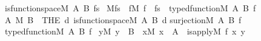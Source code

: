 \begin{isabelle}%
is{\isacharunderscore}{\kern0pt}function{\isacharunderscore}{\kern0pt}space{\isacharparenleft}{\kern0pt}M{\isacharcomma}{\kern0pt}\ A{\isacharcomma}{\kern0pt}\ B{\isacharcomma}{\kern0pt}\ fs{\isacharparenright}{\kern0pt}\ {\isasymequiv}\isanewline
M{\isacharparenleft}{\kern0pt}fs{\isacharparenright}{\kern0pt}\ {\isasymand}\ {\isacharparenleft}{\kern0pt}{\isasymforall}f{\isacharbrackleft}{\kern0pt}M{\isacharbrackright}{\kern0pt}{\isachardot}{\kern0pt}\ f\ {\isasymin}\ fs\ {\isasymlongleftrightarrow}\ typed{\isacharunderscore}{\kern0pt}function{\isacharparenleft}{\kern0pt}M{\isacharcomma}{\kern0pt}\ A{\isacharcomma}{\kern0pt}\ B{\isacharcomma}{\kern0pt}\ f{\isacharparenright}{\kern0pt}{\isacharparenright}{\kern0pt}\isasep\isanewline%
A\ {\isasymrightarrow}\isactrlbsup M\isactrlesup \ B\ {\isasymequiv}\ THE\ d{\isachardot}{\kern0pt}\ is{\isacharunderscore}{\kern0pt}function{\isacharunderscore}{\kern0pt}space{\isacharparenleft}{\kern0pt}M{\isacharcomma}{\kern0pt}\ A{\isacharcomma}{\kern0pt}\ B{\isacharcomma}{\kern0pt}\ d{\isacharparenright}{\kern0pt}\isasep\isanewline%
surjection{\isacharparenleft}{\kern0pt}M{\isacharcomma}{\kern0pt}\ A{\isacharcomma}{\kern0pt}\ B{\isacharcomma}{\kern0pt}\ f{\isacharparenright}{\kern0pt}\ {\isasymequiv}\isanewline
typed{\isacharunderscore}{\kern0pt}function{\isacharparenleft}{\kern0pt}M{\isacharcomma}{\kern0pt}\ A{\isacharcomma}{\kern0pt}\ B{\isacharcomma}{\kern0pt}\ f{\isacharparenright}{\kern0pt}\ {\isasymand}\isanewline
{\isacharparenleft}{\kern0pt}{\isasymforall}y{\isacharbrackleft}{\kern0pt}M{\isacharbrackright}{\kern0pt}{\isachardot}{\kern0pt}\ y\ {\isasymin}\ B\ {\isasymlongrightarrow}\ {\isacharparenleft}{\kern0pt}{\isasymexists}x{\isacharbrackleft}{\kern0pt}M{\isacharbrackright}{\kern0pt}{\isachardot}{\kern0pt}\ x\ {\isasymin}\ A\ {\isasymand}\ is{\isacharunderscore}{\kern0pt}apply{\isacharparenleft}{\kern0pt}M{\isacharcomma}{\kern0pt}\ f{\isacharcomma}{\kern0pt}\ x{\isacharcomma}{\kern0pt}\ y{\isacharparenright}{\kern0pt}{\isacharparenright}{\kern0pt}{\isacharparenright}{\kern0pt}%
\end{isabelle}%

